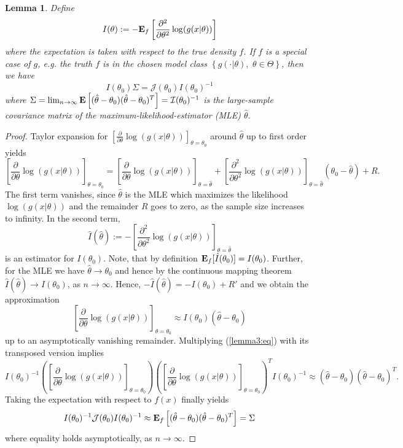 \documentclass[a4paper, 12pt]{scrreprt}
\newtheorem{Lemma}[Theorem]{Lemma}
\newcommand{\ew}{\mbox{\textbf{E}}}
\begin{document}
\begin{Lemma}\label{aic:lemma3} \upshape
Define 
\[
I(\theta) := - \ew_f\left[ \frac{\partial^2}{\partial \theta^2} \log(g(x|\theta)) \right]
\]
where the expectation is taken with respect to the true density $f$. 
If $f$ is a special case of $g$, e.g. the truth $f$ is in the chosen model class $\left\{ g(\cdot | \theta),\,\, \theta\in\Theta \right\}$, then we have	
\[ 
I(\theta_0) \Sigma = \mathcal{J}(\theta_0) I(\theta_0)^{-1}
\]
where $\Sigma = \lim_{n\to\infty} \ew \left[(\hat{\theta} - \theta_0)(\hat{\theta} - \theta_0)^T \right] = \mathcal{I}(\theta_0)^{-1}$ is the large-sample covariance matrix of the maximum-likelihood-estimator (MLE) $\hat{\theta}$.
\end{Lemma}
\begin{proof}
Taylor expansion for $\left[ \frac{\partial}{\partial \theta} \log(g(x|\theta)) \right]_{\theta =\theta_0}$ around $\hat{\theta}$ up to first order yields
\begin{equation*}
\left[ \frac{\partial}{\partial \theta} \log(g(x|\theta)) \right]_{\theta=\theta_0}= \left[ \frac{\partial}{\partial \theta} \log(g(x|\theta)) \right]_{\theta=\hat{\theta}} + \left[ \frac{\partial^2}{\partial \theta^2} \log(g(x|\theta)) \right]_{\theta = \hat{\theta}} (\theta_0 - \hat{\theta}) + R.
\end{equation*}
The first term vanishes, since $\hat{\theta}$ is the MLE which maximizes the likelihood $\log(g(x|\theta))$ and the remainder $R$ goes to zero, as the sample size increases to infinity.
In the second term,
\[ \hat{I}(\hat{\theta}) := - \left[ \frac{\partial^2}{\partial \theta^2} \log(g(x|\theta)) \right]_{\theta = \hat{\theta} } \]
is an estimator for $I(\theta_0)$.
Note, that by definition $\ew_f[\hat{I}(\theta_0)] = I(\theta_0)$. Further, for the MLE we have $\hat{\theta} \to \theta_0$ and hence by the continuous mapping theorem $\hat{I}(\hat{\theta}) \to I(\theta_0)$,  as $n \to \infty$.
Hence, $- \hat{I}(\hat{\theta}) = - I(\theta_0) + R'$ and we obtain the approximation
\begin{equation}\label{lemma3:eq}
\left[ \frac{\partial}{\partial \theta} \log(g(x|\theta)) \right]_{\theta = \theta_0} \approx I(\theta_0)(\hat{\theta} - \theta_0)
\end{equation}
up to an asymptotically vanishing remainder. Multiplying (\ref{lemma3:eq}) with its transposed version implies
\[ 
I(\theta_0)^{-1} \left( \left[ \frac{\partial}{\partial \theta} \log(g(x|\theta)) \right]_{\theta = \theta_0}
 \right) \left( \left[ \frac{\partial}{\partial \theta} \log(g(x|\theta)) \right]_{\theta = \theta_0}
 \right)^T I(\theta_0)^{-1} \approx (\hat{\theta} - \theta_0)(\hat{\theta} - \theta_0)^T.
\]
Taking the expectation with respect to $f(x)$ finally yields
\[
I(\theta_0)^{-1} \mathcal{J}(\theta_0) I(\theta_0)^{-1} \approx 
\ew_f \left[ (\hat{\theta} - \theta_0)(\hat{\theta} - \theta_0)^T \right] = \Sigma
\] 
where equality holds asymptotically, as $n\to\infty$.
\end{proof}
\end{document}
